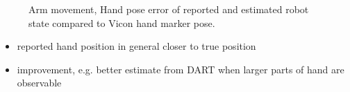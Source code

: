 \begin{figure}
\centering
{}


\caption{Arm movement, Hand pose error of reported and estimated robot state compared to Vicon hand marker pose.}
\end{figure}

\begin{itemize}
\item reported hand position in general closer to true position
\item improvement, e.g. better estimate from DART when larger parts of hand are observable
\end{itemize}


